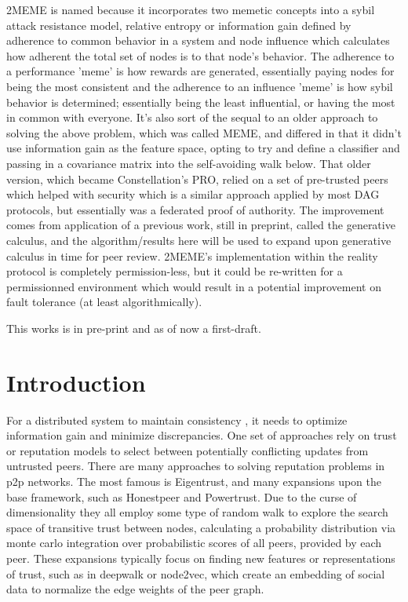 \documentclass{article}
\begin{document}
2MEME is named because it incorporates two memetic concepts into a sybil attack resistance model, relative entropy or information gain defined by adherence to common behavior in a system and node influence which calculates how adherent the total set of nodes is to that node's behavior. The adherence to a performance 'meme' is how rewards are generated, essentially paying nodes for being the most consistent and the adherence to an influence 'meme' is how sybil behavior is determined; essentially being the least influential, or having the most in common with everyone. It's also sort of the sequal to an older approach to solving the above problem, which was called MEME, and differed in that it didn't use information gain as the feature space, opting to try and define a classifier and passing in a covariance matrix into the self-avoiding walk below. That older version, which became Constellation's PRO, relied on a set of pre-trusted peers which helped with security which is a similar approach applied by most DAG protocols, but essentially was a federated proof of authority. The improvement comes from application of a previous work, still in preprint, called the generative calculus, and the algorithm/results here will be used to expand upon generative calculus in time for peer review. 2MEME's implementation within the reality protocol is completely permission-less, but it could be re-written for a permissionned environment which would result in a potential improvement on fault tolerance (at least algorithmically).

This works is in pre-print and as of now a first-draft.

\section{Introduction}
For a distributed system to maintain consistency , it needs to optimize information gain and minimize discrepancies. One set of approaches rely on trust or reputation models to select between potentially conflicting updates from untrusted peers. There are many approaches to solving reputation problems in p2p networks. The most famous is Eigentrust, and many expansions upon the base framework, such as Honestpeer and Powertrust. Due to the curse of dimensionality they all employ some type of random walk to explore the search space of transitive trust between nodes, calculating a probability distribution via monte carlo integration over probabilistic scores of all peers, provided by each peer. These expansions typically focus on finding new features or representations of trust, such as in deepwalk or node2vec, which create an embedding of social data to normalize the edge weights of the peer graph.
\end{document}
